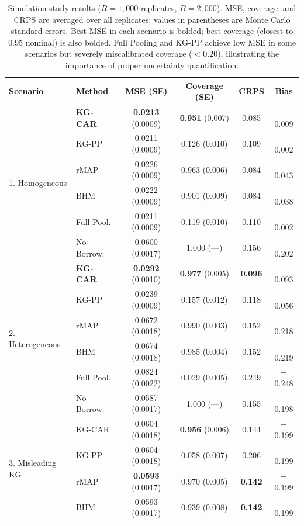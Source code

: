 \documentclass[12pt]{article}
\begin{document}
\begin{table}[ht]
\centering
\caption{Simulation study results ($R = 1{,}000$ replicates, $B = 2{,}000$). MSE, coverage, and CRPS are averaged over all replicates; values in parentheses are Monte Carlo standard errors. Best MSE in each scenario is bolded; best coverage (closest to 0.95 nominal) is also bolded. Full Pooling and KG-PP achieve low MSE in some scenarios but severely miscalibrated coverage ($< 0.20$), illustrating the importance of proper uncertainty quantification.}
\label{tab:simulation}
\small
\begin{tabular}{llcccc}
\toprule
Scenario & Method & MSE (SE) & Coverage (SE) & CRPS & Bias \\
\midrule
\multirow{6}{*}{1. Homogeneous}
& \textbf{KG-CAR} & \textbf{0.0213} (0.0009) & \textbf{0.951} (0.007) & 0.085 & $+$0.009 \\
& KG-PP & 0.0211 (0.0009) & 0.126 (0.010) & 0.109 & $+$0.002 \\
& rMAP & 0.0226 (0.0009) & 0.963 (0.006) & 0.084 & $+$0.043 \\
& BHM & 0.0222 (0.0009) & 0.901 (0.009) & 0.084 & $+$0.038 \\
& Full Pool. & 0.0211 (0.0009) & 0.119 (0.010) & 0.110 & $+$0.002 \\
& No Borrow. & 0.0600 (0.0017) & 1.000 (---) & 0.156 & $+$0.202 \\
\midrule
\multirow{6}{*}{2. Heterogeneous}
& \textbf{KG-CAR} & \textbf{0.0292} (0.0010) & \textbf{0.977} (0.005) & \textbf{0.096} & $-$0.093 \\
& KG-PP & 0.0239 (0.0009) & 0.157 (0.012) & 0.118 & $-$0.056 \\
& rMAP & 0.0672 (0.0018) & 0.990 (0.003) & 0.152 & $-$0.218 \\
& BHM & 0.0674 (0.0018) & 0.985 (0.004) & 0.152 & $-$0.219 \\
& Full Pool. & 0.0824 (0.0022) & 0.029 (0.005) & 0.249 & $-$0.248 \\
& No Borrow. & 0.0587 (0.0017) & 1.000 (---) & 0.155 & $-$0.198 \\
\midrule
\multirow{6}{*}{3. Misleading KG}
& KG-CAR & 0.0604 (0.0018) & \textbf{0.956} (0.006) & 0.144 & $+$0.199 \\
& KG-PP & 0.0604 (0.0018) & 0.058 (0.007) & 0.206 & $+$0.199 \\
& rMAP & \textbf{0.0593} (0.0017) & 0.970 (0.005) & \textbf{0.142} & $+$0.199 \\
& BHM & 0.0593 (0.0017) & 0.939 (0.008) & \textbf{0.142} & $+$0.199 \\

\end{tabular}
\end{table}
\end{document}
